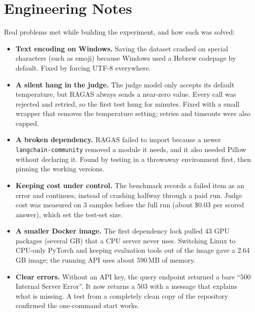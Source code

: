 \documentclass[10pt,twocolumn]{article}
\newcommand{\code}[1]{\texttt{\small #1}}
\begin{document}
\section{Engineering Notes}
Real problems met while building the experiment, and how each was solved:

\begin{itemize}
\item \textbf{Text encoding on Windows.} Saving the dataset crashed on special characters (such as emoji) because Windows used a Hebrew codepage by default. Fixed by forcing UTF-8 everywhere.
\item \textbf{A silent hang in the judge.} The judge model only accepts its default temperature, but RAGAS always sends a near-zero value. Every call was rejected and retried, so the first test hung for minutes. Fixed with a small wrapper that removes the temperature setting; retries and timeouts were also capped.
\item \textbf{A broken dependency.} RAGAS failed to import because a newer \code{langchain-community} removed a module it needs, and it also needed Pillow without declaring it. Found by testing in a throwaway environment first, then pinning the working versions.
\item \textbf{Keeping cost under control.} The benchmark records a failed item as an error and continues, instead of crashing halfway through a paid run. Judge cost was measured on 3 samples before the full run (about \$0.03 per scored answer), which set the test-set size.
\item \textbf{A smaller Docker image.} The first dependency lock pulled 43 GPU packages (several GB) that a CPU server never uses. Switching Linux to CPU-only PyTorch and keeping evaluation tools out of the image gave a 2.64\,GB image; the running API uses about 590\,MB of memory.
\item \textbf{Clear errors.} Without an API key, the query endpoint returned a bare ``500 Internal Server Error''. It now returns a 503 with a message that explains what is missing. A test from a completely clean copy of the repository confirmed the one-command start works.
\end{itemize}
\end{document}

